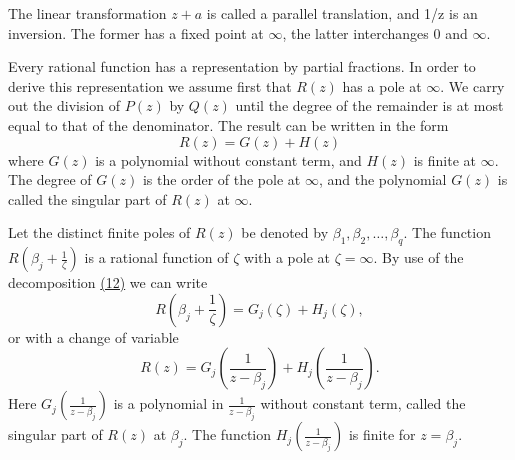 The linear transformation $z + a$ is called a parallel translation, and 1/z is an inversion. The former has a fixed point at $\infty$, the latter interchanges 0 and $\infty$.

Every rational function has a representation by partial fractions. In order to derive this representation we assume first that $R(z)$ has a pole at $\infty$. We carry out the division of $P(z)$ by $Q(z)$ until the degree of the remainder is at most equal to that of the denominator. The result can be written in the form
\begin{equation*}
R (z) = G (z) + H (z)\tag{12}\label{eq:2.12}
\end{equation*}
where $G(z)$ is a polynomial without constant term, and $H(z)$ is finite at $\infty$. The degree of $G(z)$ is the order of the pole at $\infty$, and the polynomial $G(z)$ is called the singular part of $R(z)$ at $\infty$.

Let the distinct finite poles of $R(z)$ be denoted by $\beta_1, \beta_2, \ldots, \beta_q$. The function $R\left(\beta_j + \frac{1}{\zeta}\right)$ is a rational function of $\zeta$ with a pole at $\zeta = \infty$. By use of the decomposition \hyperref[eq:2.12]{(12)} we can write
\begin{equation*}
R \left(\beta_ {j} + \frac {1}{\zeta}\right) = G _ {j} (\zeta) + H _ {j} (\zeta),
\end{equation*}
or with a change of variable
\begin{equation*}
R (z) = G _ {j} \left(\frac {1}{z - \beta_ {j}}\right) + H _ {j} \left(\frac {1}{z - \beta_ {j}}\right).
\end{equation*}
Here $G_{j}\left(\frac{1}{z - \beta_{j}}\right)$ is a polynomial in $\frac{1}{z - \beta_{j}}$ without constant term, called the singular part of $R(z)$ at $\beta_{j}$. The function $H_{j}\left(\frac{1}{z - \beta_{j}}\right)$ is finite for $z = \beta_{j}$.

